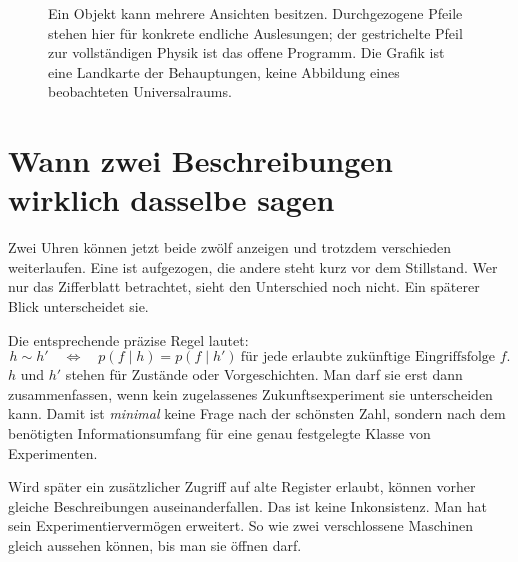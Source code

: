 \begin{figure}[H]\centering
{}
\caption{Ein Objekt kann mehrere Ansichten besitzen. Durchgezogene Pfeile stehen hier für konkrete endliche Auslesungen; der gestrichelte Pfeil zur vollständigen Physik ist das offene Programm. Die Grafik ist eine Landkarte der Behauptungen, keine Abbildung eines beobachteten Universalraums.}
\end{figure}

\section{Wann zwei Beschreibungen wirklich dasselbe sagen}
Zwei Uhren können jetzt beide zwölf anzeigen und trotzdem verschieden weiterlaufen. Eine ist aufgezogen, die andere steht kurz vor dem Stillstand. Wer nur das Zifferblatt betrachtet, sieht den Unterschied noch nicht. Ein späterer Blick unterscheidet sie.

Die entsprechende präzise Regel lautet:
\begin{equation}
h\sim h'\quad\Longleftrightarrow\quad
p(f\mid h)=p(f\mid h')\ \text{für jede erlaubte zukünftige Eingriffsfolge }f.
\label{eq:op}
\end{equation}
$h$ und $h'$ stehen für Zustände oder Vorgeschichten. Man darf sie erst dann zusammenfassen, wenn kein zugelassenes Zukunftsexperiment sie unterscheiden kann. Damit ist \emph{minimal} keine Frage nach der schönsten Zahl, sondern nach dem benötigten Informationsumfang für eine genau festgelegte Klasse von Experimenten.

Wird später ein zusätzlicher Zugriff auf alte Register erlaubt, können vorher gleiche Beschreibungen auseinanderfallen. Das ist keine Inkonsistenz. Man hat sein Experimentiervermögen erweitert. So wie zwei verschlossene Maschinen gleich aussehen können, bis man sie öffnen darf.

